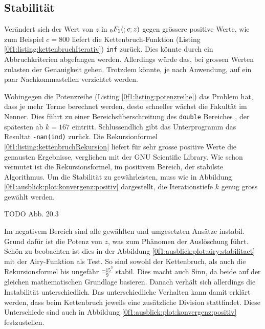\subsection{Stabilität
\label{0f1:subsection:Stabilitaet}}
Verändert sich der Wert von $z$ in $\mathstrut_0F_1(;c;z)$ gegen grössere positive Werte, wie zum Beispiel $c = 800$ liefert die Kettenbruch-Funktion (Listing \ref{0f1:listing:kettenbruchIterativ}) \verb+inf+ zurück. Dies könnte durch ein Abbruchkriterien abgefangen werden. Allerdings würde das, bei grossen Werten zulasten der Genauigkeit gehen. Trotzdem könnte, je nach Anwendung, auf ein paar Nachkommastellen verzichtet werden.

Wohingegen die Potenzreihe (Listing \ref{0f1:listing:potenzreihe}) das Problem hat, dass je mehr Terme berechnet werden, desto schneller wächst die Fakultät im Nenner. Dies führt zu einer Bereichsüberschreitung des \verb+double+ Bereiches \cite{0f1:double}, der spätesten ab $k=167$ eintritt. Schlussendlich gibt das Unterprogramm das Resultat \verb+-nan(ind)+ zurück.
Die Rekursionformel \eqref{0f1:listing:kettenbruchRekursion} liefert für sehr grosse positive Werte die genausten Ergebnisse, verglichen mit der GNU Scientific Library. Wie schon vermutet ist die Rekursionsformel, im positivem Bereich, der stabilste Algorithmus. Um die Stabilität zu gewährleisten, muss wie in Abbildung \ref{0f1:ausblick:plot:konvergenz:positiv} dargestellt, die Iterationstiefe $k$ genug gross gewählt werden.

{\color{red}TODO Abb. 20.3}

Im negativem Bereich sind alle gewählten und umgesetzten Ansätze instabil. Grund dafür ist die Potenz von $z$, was zum Phänomen der Auslöschung \cite{0f1:SeminarNumerik} führt. Schön zu beobachten ist dies in der Abbildung \ref{0f1:ausblick:plot:airy:stabilitaet} mit der Airy-Funktion als Test. So sind sowohl der Kettenbruch, als auch die Rekursionsformel bis ungefähr $\frac{-15^3}{9}$ stabil. Dies macht auch Sinn, da beide auf der gleichen mathematischen Grundlage basieren. Danach verhält sich allerdings die Instabilität unterschiedlich. Das unterschiedliche Verhalten kann damit erklärt werden, dass beim Kettenbruch jeweils eine zusätzliche Division stattfindet. Diese Unterschiede sind auch in Abbildung \ref{0f1:ausblick:plot:konvergenz:positiv} festzustellen.


